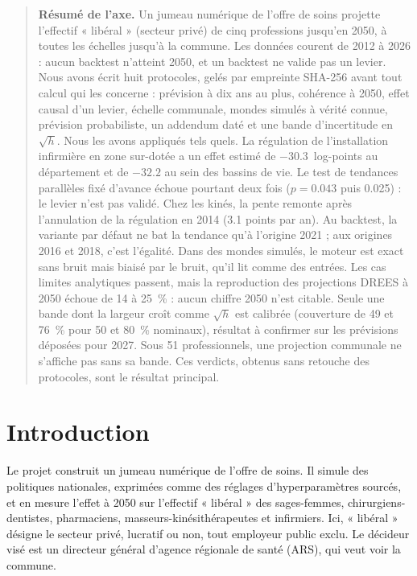 \begin{quote}\small\textbf{Résumé de l'axe.} Un jumeau numérique de l'offre de soins projette l'effectif « libéral » (secteur privé) de cinq
professions jusqu'en 2050, à toutes les échelles jusqu'à la commune. Les données courent de 2012 à
2026 : aucun backtest n'atteint 2050, et un backtest ne valide pas un levier. Nous avons écrit huit
protocoles, gelés par empreinte SHA-256 avant tout calcul qui les concerne : prévision à dix ans au
plus, cohérence à 2050, effet causal d'un levier, échelle communale, mondes simulés à vérité connue,
prévision probabiliste, un addendum daté et une bande d'incertitude en $\sqrt h$. Nous les avons appliqués tels quels. La régulation de
l'installation infirmière en zone sur-dotée a un effet estimé de $\num{-30.3}$\mesure{}~log-points
au département et de $\num{-32.2}$\mesure{} au sein des bassins de vie. Le test de tendances
parallèles fixé d'avance échoue pourtant deux fois ($p = \num{0.043}$\mesure{} puis
\num{0.025}\mesure{}) : le levier n'est pas validé. Chez les kinés, la pente remonte après
l'annulation de la régulation en 2014 (\num{3.1}\mesure{} points par an). Au backtest, la variante
par défaut ne bat la tendance qu'à l'origine 2021 ; aux origines 2016 et 2018, c'est l'égalité. Dans
des mondes simulés, le moteur est exact sans bruit mais biaisé par le bruit, qu'il lit comme des
entrées. Les cas limites analytiques passent, mais la reproduction des projections DREES à 2050
échoue de 14 à 25\mesure{}~\% : aucun chiffre 2050 n'est citable. Seule une bande dont la largeur
croît comme $\sqrt h$ est calibrée (couverture de 49 et 76\mesure{}~\% pour 50 et 80~\% nominaux),
résultat à confirmer sur les prévisions déposées pour 2027. Sous 51\mesure{} professionnels, une
projection communale ne s'affiche pas sans sa bande. Ces verdicts, obtenus sans retouche des
protocoles, sont le résultat principal.\end{quote}

\section{Introduction}
Le projet construit un jumeau numérique de l'offre de soins. Il simule des politiques nationales,
exprimées comme des réglages d'hyperparamètres sourcés, et en mesure l'effet à 2050 sur l'effectif
« libéral » des sages-femmes, chirurgiens-dentistes, pharmaciens, masseurs-kinésithérapeutes et
infirmiers. Ici, « libéral » désigne le secteur privé, lucratif ou non, tout employeur public
exclu. Le décideur visé est un directeur général d'agence régionale de santé (ARS), qui veut voir la
commune.

